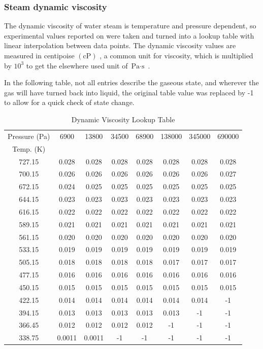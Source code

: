 \documentclass{homework}
\begin{document}
\begin{multicols}{2}
\subsubsection{Steam dynamic viscosity}
		    
		  The dynamic viscosity of water steam is temperature and pressure dependent, so experimental values reported on \cite{EngineeringToolBox_dynamic} were taken and turned into a lookup table with linear interpolation between data points. The dynamic viscosity values are measured in centipoise $(\mathrm{cP})$ , a common unit for viscosity, which is multiplied by $ 10^3$ to get the elsewhere used unit of $ \text{Pa} \cdot \text{s} $ .  
		    
		  In the following table, not all entries describe the gaseous state, and wherever the gas will have turned back into liquid, the original table value was replaced by -1 to allow for a quick check of state change.  

            \begin{table}
            [ht]
		  \centering
		  \caption{Dynamic Viscosity Lookup Table}
		  \begin{tabular}{|c|c|c|c|c|c|c|c|}
		  \hline
		  Pressure (Pa) & 6900 & 13800 & 34500 & 68900 & 138000 & 345000 & 690000 \\
            Temp. (K) &  &  &  &  &  & &  \\
		  \hline
		  727.15 & 0.028 & 0.028 & 0.028 & 0.028 & 0.028 & 0.028 & 0.028 \\
		  700.15 & 0.026 & 0.026 & 0.026 & 0.026 & 0.026 & 0.026 & 0.027 \\
		  672.15 & 0.024 & 0.025 & 0.025 & 0.025 & 0.025 & 0.025 & 0.025 \\
		  644.15 & 0.023 & 0.023 & 0.023 & 0.023 & 0.023 & 0.023 & 0.023 \\
		  616.15 & 0.022 & 0.022 & 0.022 & 0.022 & 0.022 & 0.022 & 0.022 \\
		  589.15 & 0.021 & 0.021 & 0.021 & 0.021 & 0.021 & 0.021 & 0.021 \\
		  561.15 & 0.020 & 0.020 & 0.020 & 0.020 & 0.020 & 0.020 & 0.020 \\
		  533.15 & 0.019 & 0.019 & 0.019 & 0.019 & 0.019 & 0.019 & 0.019 \\
		  505.15 & 0.018 & 0.018 & 0.018 & 0.018 & 0.017 & 0.017 & 0.017 \\
		  477.15 & 0.016 & 0.016 & 0.016 & 0.016 & 0.016 & 0.016 & 0.016 \\
		  450.15 & 0.015 & 0.015 & 0.015 & 0.015 & 0.015 & 0.015 & 0.015 \\
		  422.15 & 0.014 & 0.014 & 0.014 & 0.014 & 0.014 & 0.014 & -1 \\
		  394.15 & 0.013 & 0.013 & 0.013 & 0.013 & 0.013 & -1 & -1 \\
		  366.45 & 0.012 & 0.012 & 0.012 & 0.012 & -1 & -1 & -1 \\
		  338.75 & 0.0011 & 0.0011 & -1 & -1 & -1 & -1 & -1 \\
		  \hline
		  \end{tabular}
		  

\end{table}
\end{multicols}
\end{document}
